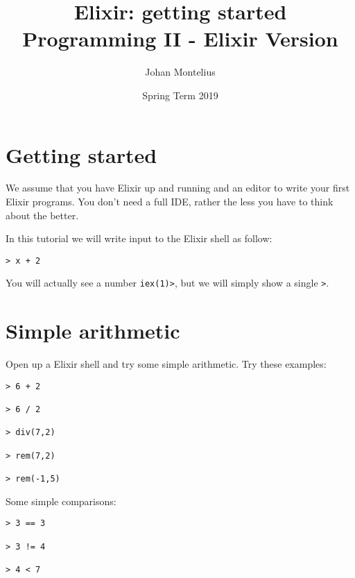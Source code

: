 \documentclass[a4paper,11pt]{article}
\begin{document}

\title{
    \textbf{Elixir: getting started}\\
    \large{Programming II - Elixir Version}
}
\author{Johan Montelius}
\date{Spring Term 2019}
\maketitle
{}



\section*{Getting started}

We assume that you have Elixir up and running and an editor to write
your first Elixir programs. You don't need a full IDE, rather the
less you have to think about the better.


In this tutorial we will write input to the Elixir shell as follow:

\begin{verbatim}
> x + 2
\end{verbatim}

You will actually see a number {\tt iex(1)>}, but we will simply
show a single {\tt >}.  



\section{Simple arithmetic}

Open up a Elixir shell and try some simple arithmetic. Try these examples:

\begin{verbatim}
> 6 + 2

> 6 / 2

> div(7,2)

> rem(7,2)

> rem(-1,5)
\end{verbatim}

Some simple comparisons:

\begin{verbatim}
> 3 == 3

> 3 != 4

> 4 < 7
\end{verbatim}
\end{document}
